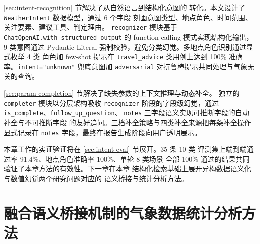 \documentclass[a4paper]{article}
\newcommand{\sectionbreak}{\clearpage} %
\theoremstyle{definition}
\theoremstyle{plain}
\theoremstyle{remark}
\newcommand{\reffig}[1]{图 \ref{#1}}
\newcommand{\reftab}[1]{表 \ref{#1}}
\let\oldcite\cite
\renewcommand{\cite}[1]{\textsuperscript{\oldcite{#1}}}
\newcommand{\bk}{\discretionary{}{}{}}
\begin{document}
\ref{sec:intent-recognition} 节解决了从自然语言到结构化意图的
转化。本文设计了 \texttt{WeatherIntent} 数据模型，通过 6 个字段
刻画意图类型、地点角色、时间范围、关注要素、建议工具、判定理由。
\texttt{recognizer} 模块基于 \texttt{ChatOpenAI.\bk{}with\_\bk{}structured\_\bk{}output}
的 function calling 模式实现结构化输出，9 类意图通过 Pydantic
Literal 强制校验，避免分类幻觉。多地点角色识别通过显式枚举 4 类
角色加 few-shot 提示在 \texttt{travel\_\bk{}advice} 类用例上达到 100\%
准确率。\texttt{intent=\bk{}"unknown"} 兜底意图加 \texttt{adversarial}
对抗鲁棒提示共同处理与气象无关的查询。

\ref{sec:param-completion} 节解决了缺失参数的上下文推理与动态补全。
独立的 \texttt{completer} 模块以分层架构吸收 \texttt{recognizer}
阶段的字段级幻觉，通过 \texttt{is\_\bk{}complete}、\texttt{follow\_\bk{}up\_\bk{}question}、
\texttt{notes} 三字段语义实现可推断字段的自动补全与不可推断字段
的友好追问。三档补全策略与四类补全来源把每条补全操作显式记录在
\texttt{notes} 字段，最终在报告生成阶段向用户透明展示。

本章工作的实证验证将在 \ref{sec:intent-eval} 节展开。35 条 10 类
评测集上端到端通过率 91.4\%、地点角色准确率 100\%、单轮 8 类场景
全部 100\% 通过的结果共同验证了本章方法的有效性。下一章在本章
结构化检索基础上展开异构数据语义化与数值幻觉两个研究问题对应的
语义桥接与统计分析方法。




\sectionbreak

\section{融合语义桥接机制的气象数据统计分析方法}
\label{chap:semantic-bridge}

﻿%
\end{document}
